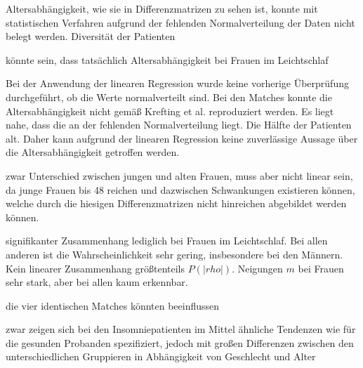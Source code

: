 Altersabhängigkeit, wie sie in Differenzmatrizen zu sehen ist, konnte mit statistischen Verfahren aufgrund der fehlenden Normalverteilung der Daten nicht belegt werden.
Diversität der Patienten

könnte sein, dass tatsächlich Altersabhängigkeit bei Frauen im Leichtschlaf

Bei der Anwendung der linearen Regression wurde keine vorherige Überprüfung durchgeführt, ob die Werte normalverteilt sind. Bei den Matches konnte die Altersabhängigkeit nicht gemäß Krefting et al. reproduziert werden. Es liegt nahe, dass die an der fehlenden Normalverteilung liegt. Die Hälfte der Patienten alt. Daher kann aufgrund der linearen Regression keine zuverlässige Aussage über die Altersabhängigkeit getroffen werden. 


zwar Unterschied zwischen jungen und alten Frauen, muss aber nicht linear sein, da junge Frauen bis 48 reichen und dazwischen Schwankungen existieren können, welche durch die hiesigen Differenzmatrizen nicht hinreichen abgebildet werden können.

signifikanter Zusammenhang lediglich bei Frauen im Leichtschlaf. Bei allen anderen ist die Wahrscheinlichkeit sehr gering, insbesondere bei den Männern. Kein linearer Zusammenhang größtenteils $P(|rho|)$. Neigungen $m$ bei Frauen sehr stark, aber bei allen kaum erkennbar.

die vier identischen Matches könnten beeinflussen

zwar zeigen sich bei den Insomniepatienten im Mittel ähnliche Tendenzen wie für die gesunden Probanden spezifiziert, jedoch mit großen Differenzen zwischen den unterschiedlichen Gruppieren in Abhängigkeit von Geschlecht und Alter